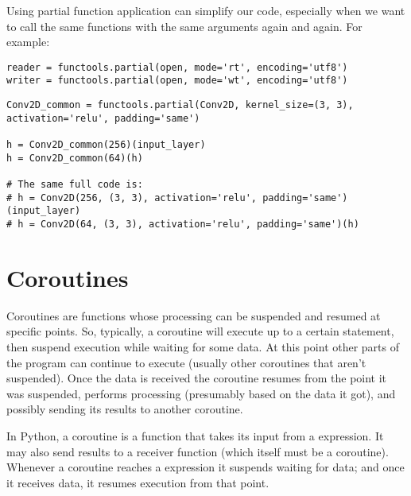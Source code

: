 Using partial function application can simplify our code, especially when we want to call the same functions with the same arguments again and again.
For example:

\begin{lstlisting}
reader = functools.partial(open, mode='rt', encoding='utf8')
writer = functools.partial(open, mode='wt', encoding='utf8')
\end{lstlisting}

\begin{lstlisting}
Conv2D_common = functools.partial(Conv2D, kernel_size=(3, 3), activation='relu', padding='same')

h = Conv2D_common(256)(input_layer)
h = Conv2D_common(64)(h)

# The same full code is:
# h = Conv2D(256, (3, 3), activation='relu', padding='same')(input_layer)
# h = Conv2D(64, (3, 3), activation='relu', padding='same')(h)  
\end{lstlisting}

\section{Coroutines}
\label{sec:coroutines}


Coroutines are functions whose processing can be suspended and resumed at specific points.
So, typically, a coroutine will execute up to a certain statement, then suspend execution while waiting for some data.
At this point other parts of the program can continue to execute (usually other coroutines that aren’t suspended).
Once the data is received the coroutine resumes from the point it was suspended, performs processing (presumably based on the data it got), and possibly sending its results to another coroutine.

In Python, a coroutine is a function that takes its input from a  expression.
It may also send results to a receiver function (which itself must be a coroutine).
Whenever a coroutine reaches a  expression it suspends waiting for data; and once it receives data, it resumes execution from that point.









